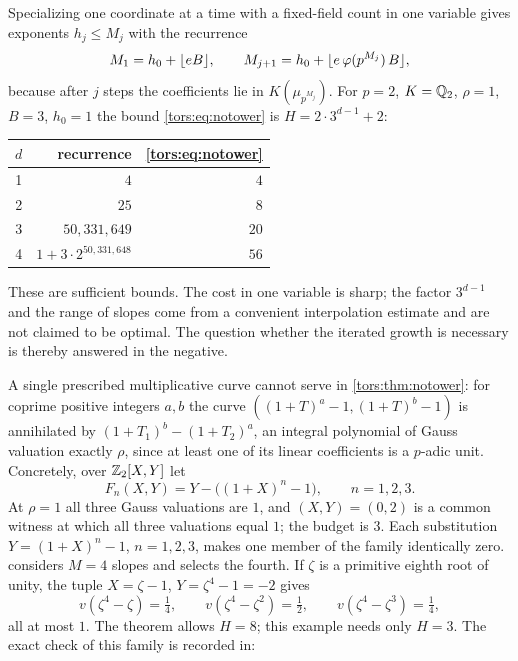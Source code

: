 \begin{remark}\label{tors:rem:tower}
Specializing one coordinate at a time with a fixed-field count in one variable gives
exponents $h_j\le M_j$ with the recurrence
\[
  M_1=h_0+\lfloor eB\rfloor,\qquad M_{j+1}=h_0+\lfloor e\,\varphi(p^{M_j})\,B\rfloor,
\]
because after $j$ steps the coefficients lie in $K(\mu_{p^{M_j}})$. For $p=2$, $K=\mathbb{Q}_2$,
$\rho=1$, $B=3$, $h_0=1$ the bound \eqref{tors:eq:notower} is $H=2\cdot3^{d-1}+2$:
\begin{center}
\begin{tabular}{@{}rrr@{}}
\toprule
$d$ & recurrence & \eqref{tors:eq:notower}\\
\midrule
1 & $4$ & $4$\\
2 & $25$ & $8$\\
3 & $50{,}331{,}649$ & $20$\\
4 & $1+3\cdot2^{50{,}331{,}648}$ & $56$\\
\bottomrule
\end{tabular}
\end{center}
These are sufficient bounds. The cost in one variable is sharp; the factor $3^{d-1}$ and
the range of slopes come from a convenient interpolation estimate and are not claimed to
be optimal. The question whether the iterated growth is necessary is thereby answered in
the negative.
\end{remark}

\begin{example}\label{tors:ex:slopes}
A single prescribed multiplicative curve cannot serve in \cref{tors:thm:notower}: for
coprime positive integers $a,b$ the curve $((1+T)^a-1,(1+T)^b-1)$ is annihilated by
$(1+T_1)^b-(1+T_2)^a$, an integral polynomial of Gauss valuation exactly $\rho$, since at
least one of its linear coefficients is a $p$-adic unit. Concretely, over $\mathbb{Z}_2[X,Y]$ let
\[
  F_n(X,Y)=Y-\bigl((1+X)^n-1\bigr),\qquad n=1,2,3 .
\]
At $\rho=1$ all three Gauss valuations are $1$, and $(X,Y)=(0,2)$ is a common witness at
which all three valuations equal $1$; the budget is $3$. Each substitution
$Y=(1+X)^n-1$, $n=1,2,3$, makes one member of the family identically zero.
 considers $M=4$ slopes and selects the fourth. If $\zeta$ is a
primitive eighth root of unity, the tuple $X=\zeta-1$, $Y=\zeta^4-1=-2$ gives
\[
  v(\zeta^4-\zeta)=\tfrac14,\qquad v(\zeta^4-\zeta^2)=\tfrac12,\qquad
  v(\zeta^4-\zeta^3)=\tfrac14,
\]
all at most $1$. The theorem allows $H=8$; this example needs only $H=3$. The exact
check of this family is recorded in:
\end{example}

